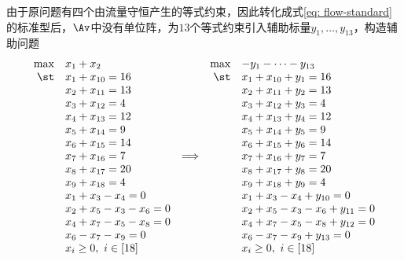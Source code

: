\documentclass{ctexart}
\begin{document}
\begin{example} 
    由于原问题有四个由流量守恒产生的等式约束，因此转化成式\eqref{eq: flow-standard}的标准型后，$\Av$中没有单位阵，为$13$个等式约束引入辅助标量$y_1, \ldots, y_{13}$，构造辅助问题
    \begin{align*}
        \begin{array}{rlcrl}
            \max & x_1 + x_2                 &                 & \max & -y_1 - \cdots - y_{13}             \\
            \st  & x_1 + x_{10} = 16         &                 & \st  & x_1 + x_{10} + y_1= 16             \\
                 & x_2 + x_{11} = 13         &                 &      & x_2 + x_{11} + y_2 = 13            \\
                 & x_3 + x_{12} = 4          &                 &      & x_3 + x_{12} + y_3 = 4             \\
                 & x_4 + x_{13} = 12         &                 &      & x_4 + x_{13} + y_4 = 12            \\
                 & x_5 + x_{14} = 9          &                 &      & x_5 + x_{14} + y_5 = 9             \\
                 & x_6 + x_{15} = 14         &                 &      & x_6 + x_{15} + y_6 = 14            \\
                 & x_7 + x_{16} = 7          & \Longrightarrow &      & x_7 + x_{16} + y_7 = 7             \\
                 & x_8 + x_{17} = 20         &                 &      & x_8 + x_{17} + y_8 = 20            \\
                 & x_9 + x_{18} = 4          &                 &      & x_9 + x_{18} + y_9 = 4             \\
                 & x_1 + x_3 - x_4 = 0       &                 &      & x_1 + x_3 - x_4 + y_{10} = 0       \\
                 & x_2 + x_5 - x_3 - x_6 = 0 &                 &      & x_2 + x_5 - x_3 - x_6 + y_{11} = 0 \\
                 & x_4 + x_7 - x_5 - x_8 = 0 &                 &      & x_4 + x_7 - x_5 - x_8 + y_{12} = 0 \\
                 & x_6 - x_7 - x_9 = 0       &                 &      & x_6 - x_7 - x_9 + y_{13} = 0       \\
                 & x_i \ge 0, ~ i \in [18]   &                 &      & x_i \ge 0, ~ i \in [18]            \\

\end{array}
\end{align*}
\end{example}
\end{document}
